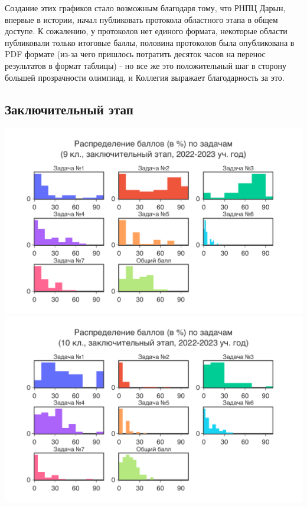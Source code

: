 Создание этих графиков стало возможным благодаря тому, что РНПЦ Дарын, впервые в истории, начал публиковать протокола областного этапа в общем доступе. К сожалению, у протоколов нет единого формата, некоторые области публиковали только итоговые баллы, половина протоколов была опубликована в PDF формате (из-за чего пришлось потратить десяток часов на перенос результатов в формат таблицы) - но все же это положительный шаг в сторону большей прозрачности олимпиад, и Коллегия выражает благодарность за это. 

\subsection{Заключительный этап}

\includegraphics[width=\linewidth]{../export/pdf/results/2023/respa/grade9-dist-problemwise.pdf}
\includegraphics[width=\linewidth]{../export/pdf/results/2023/respa/grade10-dist-problemwise.pdf}
